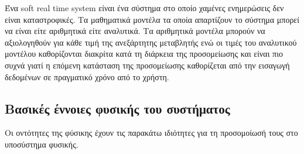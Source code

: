 Ένα soft real time system είναι ένα σύστημα στο οποίο χαμένες ενημερώσεις δεν είναι καταστροφικές.
Τα μαθηματικά μοντέλα τα οποία απαρτίζουν το σύστημα μπορεί να είναι είτε αριθμητικά είτε αναλυτικά. Τα αριθμητικά μοντέλα μπορούν να αξιολογηθούν για κάθε τιμή της ανεξάρτητης μεταβλητής ενώ οι τιμές του αναλυτικού μοντέλου καθορίζονται διακρίτα κατά τη διάρκεια της προσομείωσης και είναι πιο συχνά γιατί η επόμενη κατάσταση της προσομείωσης καθορίζεται από την εισαγωγή δεδομένων σε πραγματικό χρόνο από το χρήστη.

\subsection{Βασικές έννοιες φυσικής του συστήματος}
Οι οντότητες της φύσικης έχουν τις παρακάτω ιδιότητες για τη προσομοίωσή τους στο υποσύστημα φυσικής.

